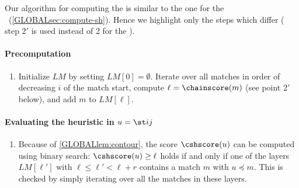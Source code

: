 Our algorithm for computing the \csh is similar to the one for the
\sh~(\cref{GLOBALsec:compute-sh}). Hence we highlight only the steps which differ (\eg
step 2$'$ is used instead of 2 for the \sh).

\paragraph{Precomputation}
\renewcommand\theenumi{\algletter\arabic{enumi}$'$}
\renewcommand\labelenumi{{\rmfamily \algletter\arabic{enumi}$'$.}}
\setlength{\leftmargini}{2.3em}
\begin{samepage}
\newcommand{\algletter}{R}
\begin{enumerate}
  \addtocounter{enumi}{4} %
  \item Initialize $LM$ by setting $LM[0] = \emptyset$. Iterate over all
        matches in order of decreasing $i$ of the match start, compute
        $\ell=\chainscore(m)$ (see point 2$'$ below), and add $m$ to $LM[\ell]$.
\end{enumerate}
\end{samepage}

\paragraph{Evaluating the heuristic in $u = \st ij$}
\begin{samepage}
\newcommand{\algletter}{E}
\begin{enumerate}
  \addtocounter{enumi}{1} %
  \item Because of \cref{GLOBALlem:contour}, the score $\cshscore(u)$
        can be computed using binary search: $\cshscore(u) \geq \ell$ holds if
        and only if one of the layers $LM[\ell']$ with ${\ell\leq \ell'<\ell+r}$
        contains a match $m$ with $u\preceq m$. This is checked by simply iterating over
        all the matches in these layers.
\end{enumerate}
\end{samepage}

